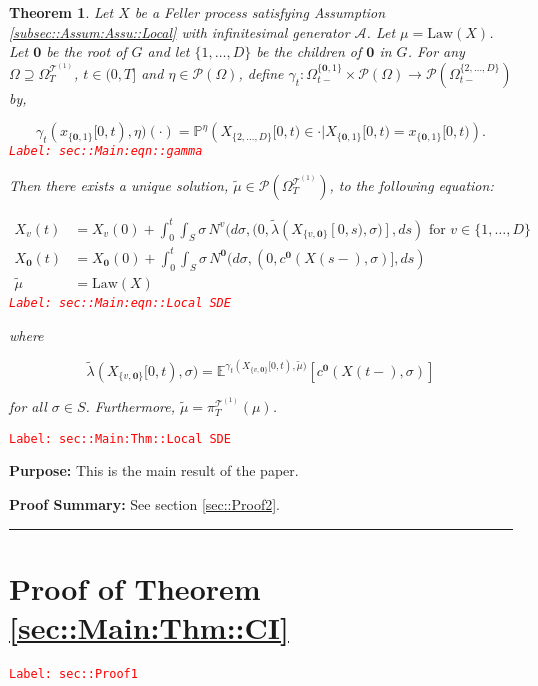 \documentclass[12pt]{article}
\newcommand{\mb}{\mathbb}
\newcommand{\mc}{\mathcal}
\newcommand{\ra}{\rightarrow}
\newcommand{\te}{\text}
\newcommand{\tr}{\textcolor{red}}
\newcommand{\labe}[1]{\tr{\texttt{Label: #1}}}
\newcommand{\purpose}{\textbf{Purpose: }}
\newcommand{\pfsum}{\textbf{Proof Summary: }}
\newcommand{\lin}{\rule{\linewidth}{0.4 pt}}
\newcommand{\pr}{\mb{P}}							%
\newcommand{\exmu}[2]{\mb{E}^{#1}\left[#2\right]}	%
\newcommand{\pmsr}{\mc{P}}							%
\renewcommand{\root}{\mathbf{0}}				%
\renewcommand{\v}{v}							%
\renewcommand{\S}{S}							%
\newcommand{\s}{\sigma}							%
\newcommand{\T}{T}								%
\newcommand{\x}{x}								%
\renewcommand{\t}{t}							%
\newcommand{\sset}{\Omega}						%
\newcommand{\proj}{\pi}							%
\renewcommand{\tt}{s}							%
\newcommand{\X}{X}								%
\newcommand{\IG}{\mc{A}}						%
\newcommand{\IGr}{c}							%
\newcommand{\vind}[1]{^{#1}}					%
\newcommand{\vsi}[1]{^{#1}}						%
\newcommand{\cind}[1]{_{#1}}					%
\newcommand{\tp}[1]{(#1)}						%
\newcommand{\tip}[1]{#1}						%
\newcommand{\ts}[1]{_{#1}}						%
\newcommand{\degr}{D}							%
\newcommand{\tree}{\mc{T}}						%
\newcommand{\sln}[1]{^{(#1)}}					%
\newcommand{\poiss}{N}							%
\newcommand{\alt}[1]{\widetilde{#1}}			%
\newcommand{\m}{\mu}							%
\newcommand{\mmm}{\eta}							%
\newcommand{\cm}{\gamma}						%
\newcommand{\law}{\te{Law}}						%
\newcommand{\me}[1]{^{#1}}						%
\newcommand{\crate}{\alt{\lambda}}				%
\newtheorem{thms}{Theorem}[section]
\begin{document}
\begin{thms}
Let \(\X\) be a Feller process satisfying Assumption \ref{subsec::Assum:Assu::Local} with infinitesimal generator \(\IG\). Let \(\m = \law(\X)\). Let \(\root\) be the root of \(G\) and let \(\{1,\dots,\degr\}\) be the children of \(\root\) in \(G\). For any \(\sset \supseteq\sset\vsi{\tree\sln{1}}\ts{\T}\), \(\t\in (0,\T]\) and \(\mmm \in \pmsr(\sset)\), define \(\cm\ts{\t}:\sset\vsi{\{\root,1\}}\ts{\t-}\times \pmsr(\sset) \ra \pmsr(\sset\vsi{\{2,\dots,\degr\}}\ts{\t-})\) by,

\begin{equation}
\cm\ts{\t}(\x\cind{\{\root,1\}}\tip{[0,\t)},\mmm)(\cdot) = \pr\me{\mmm}\left(\X\cind{\{2,\dots,\degr\}}\tip{[0,\t)} \in \cdot|\X\cind{\{\root,1\}}\tip{[0,\t)} = \x\cind{\{\root,1\}}\tip{[0,\t)}\right).
\label{sec::Main:eqn::gamma}
\end{equation}
\labe{sec::Main:eqn::gamma}

Then there exists a unique solution, \(\alt{\m} \in \pmsr(\sset\vsi{\tree\sln{1}}\ts{\T})\), to the following equation:

\begin{align}
\X\cind{\v}\tp{\t} &= \X\cind{\v}\tp{0} + \int_0^\t\int_\S \s\,\poiss\vind{\v}(d\s,(0,\crate{}(\X\cind{\{\v,\root\}}\tip{[0,\tt)},\s)],d\tt) \te{ for } \v \in \{1,\dots,\degr\}\nonumber\\
\X\cind{\root}\tp{\t} &= \X\cind{\root}\tp{0} + \int_0^\t\int_\S \s\,\poiss\vind{\root}(d\s,(0,\IGr\vind{\root}(\X\tp{\tt-},\s)],d\tt)\nonumber\\
\alt{\m} &= \law(\X)
\label{sec::Main:eqn::Local SDE}
\end{align}
\labe{sec::Main:eqn::Local SDE}

where

\[\crate{}(\X\cind{\{\v,\root\}}\tip{[0,\t)},\s) = \exmu{\cm\ts{\t}(\X\cind{\{\v,\root\}}\tip{[0,\t)},\alt{\m})}{\IGr\vind{\root}(\X\tp{\t-},\s)}\]

for all \(\s\in \S\). Furthermore, \(\alt{\m} = \proj\vsi{\tree\sln{1}}\ts{\T}(\m)\).
\label{sec::Main:Thm::Local SDE}
\end{thms}
\labe{sec::Main:Thm::Local SDE}

\purpose This is the main result of the paper. 

\pfsum See section \ref{sec::Proof2}.

\lin

\section{Proof of Theorem \ref{sec::Main:Thm::CI}}
\label{sec::Proof1}\labe{sec::Proof1}
\end{document}

